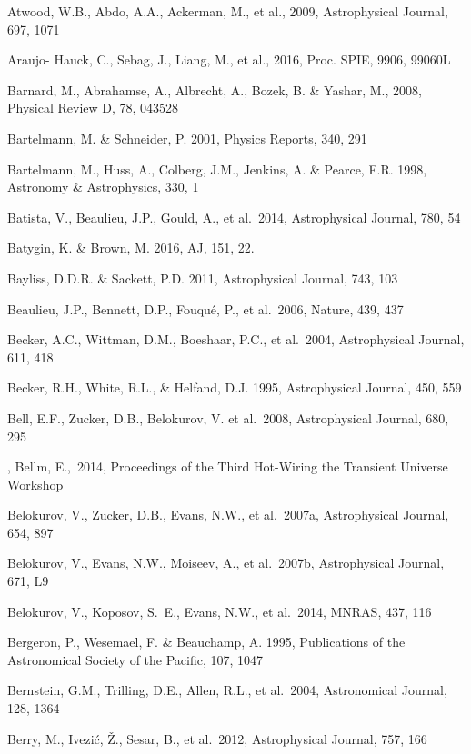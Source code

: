 \documentclass{emulateapj}
\begin{document}
\begin{thebibliography}{}
\bibitem[()]{} Atwood, W.B., Abdo, A.A., Ackerman, M., et al., 2009, Astrophysical Journal, 697, 1071

 Araujo- Hauck, C., Sebag, J., Liang, M., et al., 2016,  Proc. SPIE, 9906, 99060L  

\bibitem[()]{} Barnard, M., Abrahamse, A., Albrecht, A., Bozek, B. \& Yashar, M., 2008, Physical Review D, 78, 043528

\bibitem[()]{} Bartelmann, M. \& Schneider, P. 2001, Physics Reports, 340, 291

\bibitem[()]{} Bartelmann, M., Huss, A., Colberg, J.M., Jenkins, A. \& Pearce, F.R. 1998, Astronomy \&
             Astrophysics, 330, 1

\bibitem[()]{} Batista, V., Beaulieu, J.P., Gould, A., et al.~2014, Astrophysical Journal, 780, 54

\bibitem[()]{} Batygin, K. \& Brown, M. 2016, AJ, 151, 22.

\bibitem[()]{} Bayliss, D.D.R. \& Sackett, P.D. 2011, Astrophysical Journal, 743, 103

\bibitem[()]{} Beaulieu, J.P., Bennett, D.P., Fouqu\'{e}, P., et al.~2006, Nature, 439, 437

\bibitem[()]{} Becker, A.C., Wittman, D.M., Boeshaar, P.C., et al.~2004, Astrophysical Journal, 611, 418

\bibitem[()]{} Becker, R.H., White, R.L., \& Helfand, D.J. 1995, Astrophysical Journal, 450, 559

\bibitem[()]{} Bell, E.F., Zucker, D.B., Belokurov, V. et al.~2008, Astrophysical Journal, 680, 295

\bibitem[()]{}, Bellm, E.,~2014, Proceedings of the Third Hot-Wiring the Transient Universe Workshop

\bibitem[()]{} Belokurov, V., Zucker, D.B., Evans, N.W., et al.~2007a, Astrophysical Journal, 654, 897

\bibitem[()]{} Belokurov, V., Evans, N.W., Moiseev, A., et al.~2007b, Astrophysical Journal, 671, L9

\bibitem[()]{} Belokurov, V., Koposov, S.~E., Evans, N.W., et al.~2014, MNRAS, 437, 116

\bibitem[()]{} Bergeron, P., Wesemael, F. \& Beauchamp, A. 1995, Publications of the Astronomical Society
                   of the Pacific, 107, 1047

\bibitem[()]{} Bernstein, G.M., Trilling, D.E., Allen, R.L., et al.~2004, Astronomical Journal, 128, 1364

\bibitem[()]{} Berry, M., Ivezi\'c, \v Z., Sesar, B., et al.~2012, Astrophysical Journal, 757, 166


\end{thebibliography}
\end{document}
